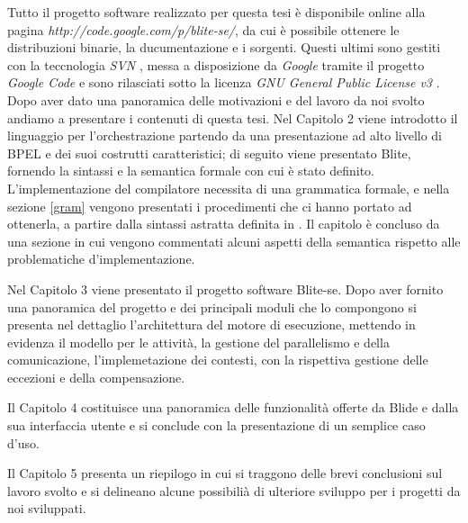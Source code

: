 Tutto il progetto software realizzato per questa tesi è disponibile online alla
pagina \emph{http://code.google.com/p/blite-se/}, da cui è possibile ottenere le
distribuzioni binarie, la ducumentazione e i sorgenti. Questi ultimi sono
gestiti con la teccnologia \emph{SVN} \cite{SVN}, messa a disposizione da
\emph{Google} tramite il progetto \emph{Google Code} \cite{GCode} e sono rilasciati
sotto la licenza \emph{GNU General Public License v3} \cite{GPLv3}.
\\

% 

Dopo aver dato una panoramica delle motivazioni e del lavoro da noi svolto
andiamo a presentare i contenuti di questa tesi. Nel Capitolo 2 viene introdotto
il linguaggio per l'orchestrazione partendo da una presentazione ad alto livello
di BPEL e dei suoi costrutti caratteristici; di seguito viene presentato Blite,
fornendo la sintassi e la semantica formale con cui è stato definito.
L'implementazione del compilatore necessita di una grammatica formale, e nella
sezione \ref{gram} vengono presentati i procedimenti che ci hanno portato ad
ottenerla, a partire dalla sintassi astratta definita in \cite{LaPuTie1}. Il
capitolo è concluso da una sezione in cui vengono commentati alcuni aspetti della
semantica rispetto alle problematiche d'implementazione.

Nel Capitolo 3 viene presentato il progetto software Blite-se. Dopo aver
fornito una panoramica del progetto e dei principali moduli che lo compongono si
presenta nel dettaglio l'architettura del motore di esecuzione, mettendo in
evidenza il modello per le attività, la gestione del parallelismo e della
comunicazione, l'implemetazione dei contesti, con la rispettiva gestione delle
eccezioni e della compensazione.

Il Capitolo 4 costituisce una panoramica delle funzionalità offerte da Blide e
dalla sua interfaccia utente e si conclude con la presentazione di un semplice
caso d'uso. 

Il Capitolo 5 presenta un riepilogo in cui si traggono delle brevi
conclusioni sul lavoro svolto e si delineano alcune possibilià di ulteriore
sviluppo per i progetti da noi sviluppati.
